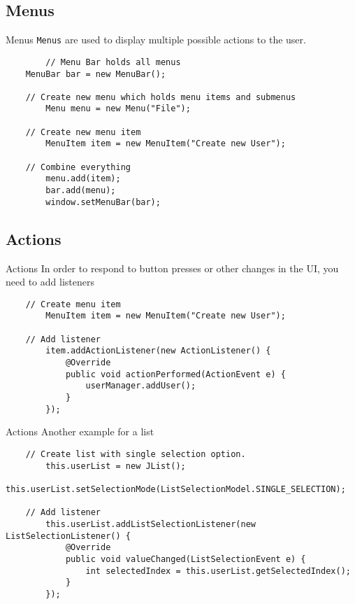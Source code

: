 \subsection{Menus}
\begin{frame}[fragile]{Menus}
  \texttt{Menus} are used to display multiple possible actions to the user.
	\begin{lstlisting}
		// Menu Bar holds all menus
    MenuBar bar = new MenuBar();
    
    // Create new menu which holds menu items and submenus
		Menu menu = new Menu("File");

    // Create new menu item 
		MenuItem item = new MenuItem("Create new User");
    
    // Combine everything
		menu.add(item);
		bar.add(menu);
		window.setMenuBar(bar);
	\end{lstlisting}
\end{frame}

\subsection{Actions}
\begin{frame}[fragile]{Actions}
  In order to respond to button presses or other changes in the UI, you need to add listeners
	\begin{lstlisting}
    // Create menu item
		MenuItem item = new MenuItem("Create new User");
  
    // Add listener
		item.addActionListener(new ActionListener() {
			@Override
			public void actionPerformed(ActionEvent e) {
				userManager.addUser();
			}
		});
  \end{lstlisting}
\end{frame}
    
\begin{frame}[fragile]{Actions}
  Another example for a list
	\begin{lstlisting}
    // Create list with single selection option.
		this.userList = new JList();
		this.userList.setSelectionMode(ListSelectionModel.SINGLE_SELECTION);
      
    // Add listener
		this.userList.addListSelectionListener(new ListSelectionListener() {
			@Override
			public void valueChanged(ListSelectionEvent e) {
				int selectedIndex = this.userList.getSelectedIndex();
			}
		});
    \end{lstlisting}
\end{frame}
